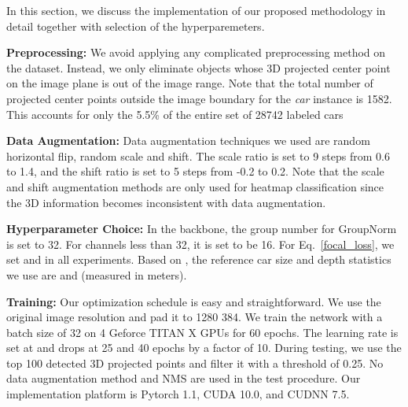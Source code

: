 \documentclass[10pt,twocolumn,letterpaper]{article}
\renewcommand{\paragraph}[1]{

        \vspace{3pt}
	\noindent\textbf{#1}}
\begin{document}
    In this section, we discuss the implementation of our proposed methodology in detail together with selection of the hyperparemeters.

    \paragraph{Preprocessing:} 
    We avoid applying any complicated preprocessing method on the dataset. Instead, we only eliminate objects whose 3D projected center point on the image plane is out of the image range. Note that the total number of projected center points outside the image boundary for the \textit{car} instance is 1582. This accounts for only the 
    5.5\% of the entire set of 28742 labeled cars

    \paragraph{Data Augmentation:} 
    Data augmentation techniques we used are random horizontal flip, random scale and shift. The scale ratio is set to 9 steps from 0.6 to 1.4, and the shift ratio is set to 5 steps from -0.2 to 0.2. Note that the scale and shift augmentation methods are only used for heatmap classification since the 3D information becomes inconsistent with data augmentation.

    \paragraph{Hyperparameter Choice:} 
    In the backbone, the group number for GroupNorm is set to 32. For channels less than 32, it is set to be 16. For Eq.~\eqref{focal_loss}, we set  and  in all experiments. Based on \cite{monodis_2019}, the reference car size and depth statistics we use are  and  (measured in meters).

    \paragraph{Training:} 
    Our optimization schedule is easy and straightforward. We use the original image resolution and pad it to 1280  384. We train the network with a batch size of 32 on 4 Geforce TITAN X GPUs for 60 epochs. The learning rate is set at  and drops at 25 and 40 epochs by a factor of 10. During testing, we use the top 100 detected 3D projected points and filter it with a threshold of 0.25. No data augmentation method and NMS are used in the test procedure. Our implementation platform is Pytorch 1.1, CUDA 10.0, and CUDNN 7.5.
\end{document}
